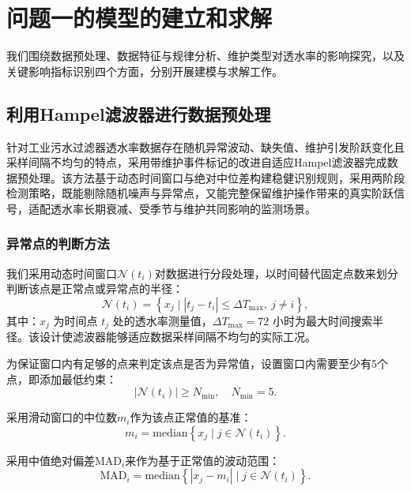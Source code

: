 \documentclass[withoutpreface,bwprint]{cumcmthesis}
\begin{document}

\section{问题一的模型的建立和求解}

我们围绕数据预处理、数据特征与规律分析、维护类型对透水率的影响探究，以及关键影响指标识别四个方面，分别开展建模与求解工作。

\subsection{利用Hampel滤波器进行数据预处理}

针对工业污水过滤器透水率数据存在随机异常波动、缺失值、维护引发阶跃变化且采样间隔不均匀的特点，采用带维护事件标记的改进自适应Hampel滤波器完成数据预处理。该方法基于动态时间窗口与绝对中位差构建稳健识别规则，采用两阶段检测策略，既能剔除随机噪声与异常点，又能完整保留维护操作带来的真实阶跃信号，适配透水率长期衰减、受季节与维护共同影响的监测场景。

\subsubsection{异常点的判断方法}

我们采用动态时间窗口$\mathcal{N}(t_i)$对数据进行分段处理，以时间替代固定点数来划分判断该点是正常点或异常点的半径：
\begin{equation}
	\mathcal{N}(t_i) = \left\{ x_j \mid |t_j - t_i| \leq \Delta T_{\max},\ j \neq i \right\},
\end{equation}
其中：$x_j$ 为时间点 $t_j$ 处的透水率测量值，$\Delta T_{\max} = 72$ 小时为最大时间搜索半径。该设计使滤波器能够适应数据采样间隔不均匀的实际工况。

为保证窗口内有足够的点来判定该点是否为异常值，设置窗口内需要至少有5个点，即添加最低约束：
\begin{equation}
	|\mathcal{N}(t_i)| \geq N_{\min},\quad N_{\min} = 5.
\end{equation}

采用滑动窗口的中位数$m_i$作为该点正常值的基准：
\begin{equation}
	m_i = \text{median}\left\{ x_j \mid j \in \mathcal{N}(t_i) \right\}.
\end{equation}

采用中值绝对偏差$\text{MAD}_i$来作为基于正常值的波动范围：
\begin{equation}
	\text{MAD}_i = \text{median}\left\{ |x_j - m_i| \mid j \in \mathcal{N}(t_i) \right\}.
\end{equation}
\end{document}
